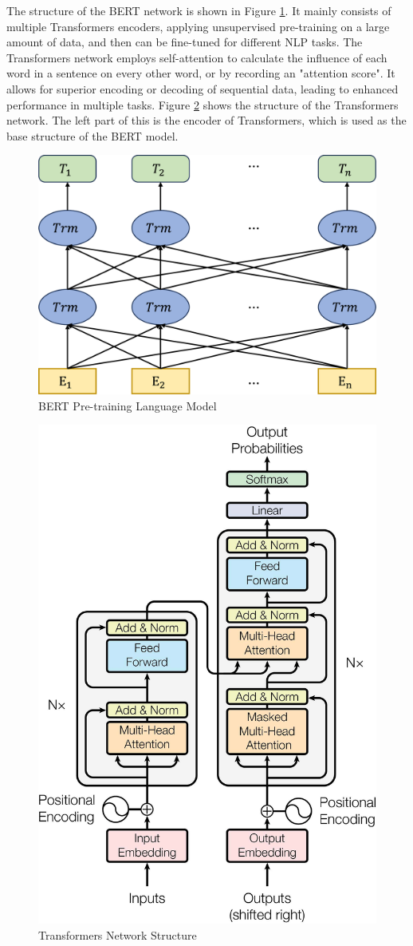 \documentclass[ %
                    author={Bocheng Wang},
                supervisor={Dr. Qiang Liu},
                    degree={MSc},
                     title={A Research on Identification of Suicide Ideation in Texts with Multiple Models},
                      type={},
                      year={2024}]{dissertation}
\begin{document}
The structure of the BERT network is shown in Figure \ref{fig:bertstructure}. It mainly consists of multiple Transformers encoders, applying unsupervised pre-training on a large amount of data, and then can be fine-tuned for different NLP tasks. The Transformers network employs self-attention to calculate the influence of each word in a sentence on every other word, or by recording an "attention score". It allows for superior encoding or decoding of sequential data, leading to enhanced performance in multiple tasks. Figure \ref{fig:transformerstructure} shows the structure of the Transformers network. The left part of this is the encoder of Transformers, which is used as the base structure of the BERT model.

\begin{figure}[h]
      \centering
      \includegraphics[width=0.4\linewidth]{../img/bert.eps}
      \caption[BERT Pre-training Language Model Diagram]{BERT Pre-training Language Model\cite{devlin2018bert}}
      \label{fig:bertstructure}
\end{figure}

\begin{figure}[h]
      \centering
      \includegraphics[width=0.5\linewidth]{../img/transformer.jpg}
      \caption[Transformers Network Structure]{Transformers Network Structure\cite{vaswani2017attention}}
      \label{fig:transformerstructure}
\end{figure}
\end{document}
